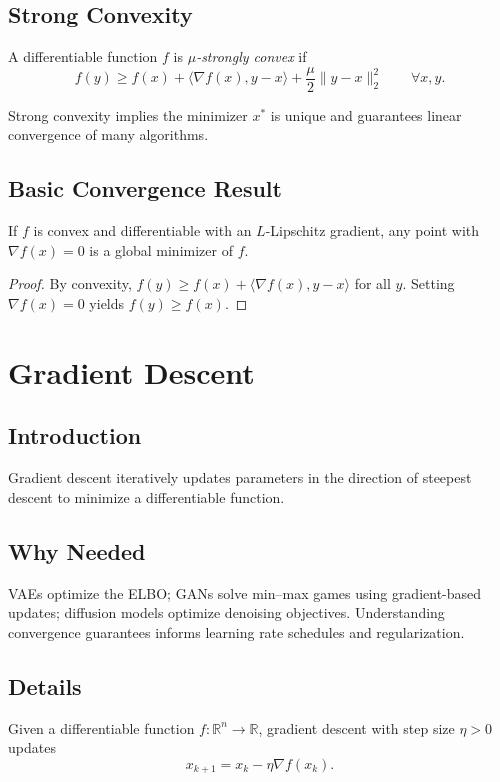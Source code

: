 \subsection{Strong Convexity}
\begin{definition}
A differentiable function $f$ is \emph{$\mu$-strongly convex} if
\begin{equation}
f(y)\ge f(x)+\langle\nabla f(x),y-x\rangle+\frac{\mu}{2}\|y-x\|_2^2 \qquad \forall x,y.
\end{equation}
\end{definition}
Strong convexity implies the minimizer $x^*$ is unique and guarantees linear convergence of many algorithms.

\subsection{Basic Convergence Result}
\begin{theorem}
If $f$ is convex and differentiable with an $L$-Lipschitz gradient, any point with $\nabla f(x)=0$ is a global minimizer of $f$.
\end{theorem}
\begin{proof}
By convexity, $f(y)\ge f(x)+\langle\nabla f(x),y-x\rangle$ for all $y$. Setting $\nabla f(x)=0$ yields $f(y)\ge f(x)$.
\end{proof}

\section{Gradient Descent}
\subsection{Introduction}
Gradient descent iteratively updates parameters in the direction of steepest descent to minimize a differentiable function.

\subsection{Why Needed}
VAEs optimize the ELBO; GANs solve min--max games using gradient-based updates; diffusion models optimize denoising objectives. Understanding convergence guarantees informs learning rate schedules and regularization.

\subsection{Details}
Given a differentiable function $f: \mathbb{R}^n \to \mathbb{R}$, gradient descent with step size $\eta>0$ updates
\begin{equation}
x_{k+1} = x_k - \eta \nabla f(x_k).
\end{equation}

